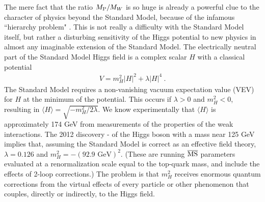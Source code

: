 \documentclass[12pt]{article}
\def\beq{\begin{eqnarray}}
\def\eeq{\end{eqnarray}}
\def\msbar{\overline{\rm MS}}
\def\MPlanck{M_{\rm P}}
\begin{document}
The mere fact that the ratio $\MPlanck/M_W$ is so huge is already a
powerful clue to the character of physics beyond the Standard Model,
because of the infamous ``hierarchy problem" \cite{hierarchyproblem}. This
is not really a difficulty with the Standard Model itself, but rather a
disturbing sensitivity of the Higgs potential to new physics in almost any
imaginable extension of the Standard Model. The electrically neutral part
of the Standard Model Higgs field is a complex scalar $H$ with a classical
potential
\beq
V = m_H^2 |H|^2 + {\lambda} |H|^4\> .
\label{higgspotential}
\eeq
The Standard Model requires a non-vanishing vacuum expectation value (VEV)
for $H$ at the minimum of the potential. This occurs if $\lambda > 0$
and $m_H^2 < 0$, resulting in $\langle H \rangle =
\sqrt{-m_H^2/2\lambda}$. 
We know experimentally that $\langle H \rangle$ is approximately 174 GeV 
from measurements of the properties of
the weak interactions. 
The 2012 discovery 
\cite{Higgsdiscovery}-\cite{Higgsmass} 
of the Higgs boson with a mass
near 125 GeV implies that, assuming the Standard Model is correct as an 
effective field theory, $\lambda = 0.126$ and $m_H^2 = -(\mbox{92.9 GeV})^2$. 
(These are running $\msbar$ parameters evaluated at a renormalization scale 
equal to the top-quark mass, and include the effects of 2-loop corrections.)
The problem is that $m_H^2$ receives enormous quantum
corrections from the virtual effects of every particle or other phenomenon
that couples, directly or indirectly, to the Higgs field. 
\end{document}
